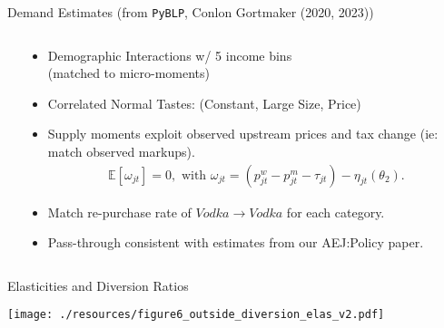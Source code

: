 \begin{frame}{Demand Estimates (from \texttt{PyBLP}, Conlon Gortmaker (2020, 2023))}
\begin{columns}[T]
 \hspace{-1.5cm}
 \begin{column}{.68\textwidth}
\vspace{-0.3cm}
    \begin{center}
    \scalebox{0.55}{
    
    }
    \end{center}
  \end{column}
  \hfill
 \hspace{-2.2cm}
\begin{column}{.55\textwidth}
  \begin{itemize}
    \item Demographic Interactions w/ 5 income bins \\ (matched to micro-moments)
    \item Correlated Normal Tastes: (Constant, Large Size, Price)
    \item Supply moments exploit observed upstream prices and tax change (ie: match observed markups).
    \vspace{-0.2cm}
    \begin{align*}
    \mathbb{E}[\omega_{jt}]=0, \text{ with }\omega_{jt} = \left(p^w_{jt}  - p^m_{jt}-\tau_{jt} \right) -\eta_{jt}\left(\theta_2\right).
    \end{align*}
   \vspace{-0.8cm}
   \item Match re-purchase rate of $Vodka \rightarrow Vodka$ for each category.
    \item Pass-through consistent with estimates from our AEJ:Policy paper.
  \end{itemize}
\end{column}
\end{columns}
\end{frame}

\begin{frame}{Elasticities and Diversion Ratios}
\begin{center}
    \texttt{[image: ./resources/figure6\_outside\_diversion\_elas\_v2.pdf]}
\end{center}
\end{frame}



